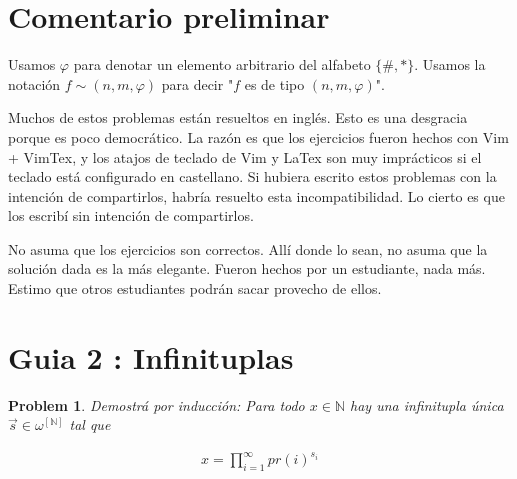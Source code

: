 \documentclass[a4paper, 12pt]{article}
\newtheorem{problem}{Problem}
\newtheorem{problem}{Problem}
\begin{document}
\section{Comentario preliminar}

Usamos $\varphi$ para denotar un elemento arbitrario del alfabeto $\{\#, *\}$. Usamos la notación $f \sim (n, m, \varphi)$ para decir "$f$ es de
tipo $(n, m, \varphi)$".

Muchos de estos problemas están resueltos en inglés. Esto es una desgracia
porque es poco democrático. La razón es que los ejercicios fueron hechos con Vim
+ VimTex, y los atajos de teclado de Vim y LaTex son muy imprácticos si el
teclado está configurado en castellano. Si hubiera escrito estos problemas con
la intención de compartirlos, habría resuelto esta incompatibilidad. Lo cierto
es que los escribí sin intención de compartirlos. 

No asuma que los ejercicios son correctos. Allí donde lo sean, no asuma que la
solución dada es la más elegante. Fueron hechos por un estudiante, nada más.
Estimo que otros estudiantes podrán sacar provecho de ellos.

\section{Guia 2 : Infinituplas}


\begin{problem}
    Demostrá por inducción: 
    Para todo $x \in \mathbb{N}$ hay una infinitupla única $\overrightarrow{s}
    \in \omega^{[\mathbb{N}]}$ tal que

    \begin{align*}
        x = \prod_{i=1}^{\infty} pr(i)^{s_i}
    \end{align*}
\end{problem}
\end{document}
